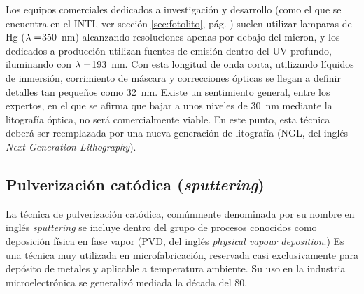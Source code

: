 		Los equipos comerciales dedicados a investigación y desarrollo (como el que se encuentra en el INTI, ver sección \ref{sec:fotolito}, pág. \pageref{sec:fotolito}) suelen utilizar lamparas de Hg ($\lambda\index{longitud de onda}=$\SI{350}{\nm}) alcanzando resoluciones apenas por debajo del micron, y los dedicados a producción utilizan fuentes de emisión dentro del UV profundo, iluminando con $\lambda\index{longitud de onda}=$\SI{193}{\nm}. Con esta longitud de onda corta, utilizando líquidos de inmersión, corrimiento de máscara y correcciones ópticas se llegan a definir detalles tan pequeños como \SI{32}{\nm}.\cite{moore2006a} Existe un sentimiento general, entre los expertos, en el que se afirma que bajar a unos niveles de \SI{30}{\nm} mediante la litografía óptica, no será comercialmente viable. En este punto, esta técnica deberá ser reemplazada por una nueva generación de litografía (NGL, del inglés \textit{Next Generation Lithography}).\cite{Asano2017,Schoot2017,Hasan2017,Naujok2017,Wan2017}
	
	\subsection{Pulverización catódica (\textit{sputtering})}
				
		La técnica de pulverización catódica, comúnmente denominada por su nombre en inglés \textit{sputtering} se incluye dentro del grupo de procesos conocidos como deposición física en fase vapor (PVD, del inglés \textit{physical vapour deposition}.) Es una técnica muy utilizada en microfabricación, reservada casi exclusivamente para depósito de metales y aplicable a temperatura ambiente. Su uso en la industria microelectrónica se generalizó mediada la década del 80.\cite{Depla2010,Kelly2000}

